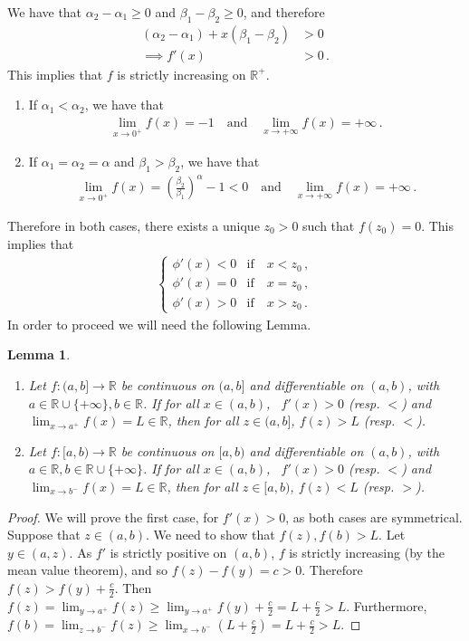 \documentclass{article}
\newcommand{\R}{\mathbb{R}}
\newtheorem{lemma}[theorem]{Lemma}
\begin{document}
%
We have that $\alpha_2 - \alpha_1 \geq 0$ and
$\beta_1 - \beta_2 \geq 0$, and therefore
%
\begin{align*}
	(\alpha_2 - \alpha_1) + x(\beta_1 - \beta_2) &> 0\\
	\implies f'(x) & > 0 \,.
\end{align*}
%
This implies that $f$ is strictly increasing on $\R^+$.
%
\begin{enumerate}
	\item If $\alpha_1 < \alpha_2$, we have that
		\begin{align*}
			\lim_{x \to 0^+} f(x) = -1 \quad \text{and} \quad
				\lim_{x \to +\infty} f(x) = +\infty\,.
		\end{align*}
	\item If $\alpha_1 = \alpha_2 = \alpha$ and $\beta_1 > \beta_2$,
		we have that
		\begin{align*}
			\lim_{x \to 0^+} f(x)
				= \left(\frac{\beta_2}{\beta_1}\right) ^ \alpha - 1 < 0 \quad
				\text{and} \quad \lim_{x \to +\infty} f(x) = +\infty \,.
		\end{align*}
\end{enumerate}
%
Therefore in both cases, there exists a unique $z_0 > 0$
such that $f(z_0) = 0$. This implies that
%
\begin{align*}
	\begin{cases}
		\phi'(x) < 0 &\text{if} \quad x < z_0 \,,\\
		\phi'(x) = 0 &\text{if} \quad x = z_0 \,,\\
		\phi'(x) > 0 &\text{if} \quad x > z_0 \,.
	\end{cases}
\end{align*}
%
In order to proceed we will need the following Lemma.
%
\begin{lemma}
	\begin{enumerate}
		\item Let $f \colon (a, b] \to \R$ be continuous on $(a, b]$
			and differentiable on $(a, b)$, with 
			$a \in \R \cup \{+\infty\}, b \in \R$. If for all $x \in (a, b)$,
			\ $f'(x) > 0$ (resp. $<$) and $\lim_{x \to a^+} f(x) = L \in \R$,
			then for all $z \in (a, b]$, $f(z) > L$ (resp. $<$).
		\item Let $f \colon [a, b) \to \R$ be continuous on $[a, b)$
			and differentiable on $(a, b)$, with
			$a \in \R, b \in \R \cup \{+\infty\}$. If for all $x\in(a, b)$,
			\ $f'(x) > 0$ (resp. $<$) and $\lim_{x \to b^-} f(x) = L \in \R$,
			then for all $z \in [a, b)$, $f(z) < L$ (resp. $>$).
	\end{enumerate}
	\label{lemma:limit}
\end{lemma}
%
\begin{proof}
	We will prove the first case, for $f'(x) > 0$,
	as both cases are symmetrical. Suppose that $z \in (a, b)$.
	We need to show that $f(z),f(b) > L$. Let $y \in (a, z)$.
	As $f'$ is strictly positive on $(a, b)$, $f$ is strictly increasing
	(by the mean value theorem), and so $f(z) - f(y) = c > 0$.
	Therefore $f(z) > f(y) + \frac{c}{2}$.
	Then $f(z) = \lim_{y \to a^+} f(z) \geq \lim_{y \to a^+} f(y)
	+ \frac{c}{2} = L + \frac{c}{2} > L$.
	Furthermore, $f(b) = \lim_{z \to b^-} f(z) \geq \lim_{x \to b^-} 
	(L + \frac{c}{2}) = L + \frac{c}{2} > L$.
\end{proof}
%
\end{document}
